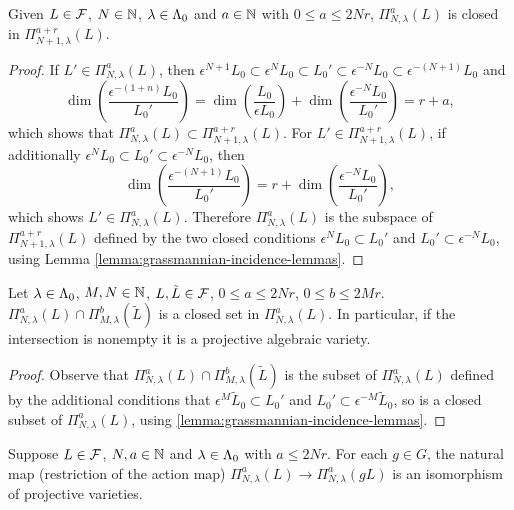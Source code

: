 \documentclass[a4paper, 11pt]{report}
\begin{document}
\begin{lemma}\label{lemma:nesting-subvarieties}
Given $L\in\mathcal{F}$, $N\in\mathbb{N}$, $\lambda\in\Lambda_0{}$ and $a\in\mathbb{N}$ with $0\le a\le 2Nr$, $\Pi_{N,\lambda}^a(L)$ is closed in $\Pi_{N+1,\lambda}^{a+r}(L)$.
\end{lemma}

\begin{proof}
If $L'\in\Pi_{N,\lambda}^{a}(L)$, then $\epsilon^{N+1}L_0\subset \epsilon^N L_0\subset L_0'\subset\epsilon^{-N}L_0\subset\epsilon^{-(N+1)}L_0$ and
\begin{equation*}
\dim\left(\frac{\epsilon^{-(1+n)}L_0}{L_0'}\right) = \dim\left(\frac{L_0}{\epsilon L_0}\right) + \dim\left(\frac{\epsilon^{-N}L_0}{L_0'}\right) = r+a,
\end{equation*}
which shows that $\Pi_{N,\lambda}^a(L)\subset \Pi_{N+1,\lambda}^{a+r}(L)$. For $L'\in\Pi_{N+1,\lambda}^{a+r}(L)$, if additionally $\epsilon^N L_0\subset L_0'\subset\epsilon^{-N}L_0$, then
\begin{equation*}
\dim\left(\frac{\epsilon^{-(N+1)}L_0}{L_0'}\right) = r + \dim\left(\frac{\epsilon^{-N}L_0}{L_0'}\right),
\end{equation*}
which shows $L'\in\Pi_{N,\lambda}^a(L)$. Therefore $\Pi_{N,\lambda}^a(L)$ is the subspace of $\Pi_{N+1,\lambda}^{a+r}(L)$ defined by the  two closed conditions $\epsilon^N L_0\subset L_0'$ and $L_0'\subset\epsilon^{-N}L_0$, using Lemma \ref{lemma:grassmannian-incidence-lemmas}.
\end{proof}

\begin{lemma}
Let $\lambda\in\Lambda_0{}$, $M,N\in\mathbb{N}$, $L,\tilde{L}\in\mathcal{F}$, $0\le a\le 2Nr$, $0\le b\le 2Mr$. $\Pi_{N,\lambda}^a(L)\cap \Pi_{M,\lambda}^b(\tilde{L})$ is a closed set in $\Pi_{N,\lambda}^a(L)$. In particular, if the intersection is nonempty it is a projective algebraic variety.
\end{lemma}

\begin{proof}
Observe that $\Pi_{N,\lambda}^a(L)\cap\Pi_{M,\lambda}^b(\tilde{L})$ is the subset of $\Pi_{N,\lambda}^a(L)$ defined by the additional conditions that $\epsilon^M \tilde{L}_0\subset L_0'$ and $L_0'\subset\epsilon^{-M}\tilde{L}_0$, so is a closed subset of $\Pi_{N,\lambda}^a(L)$, using \ref{lemma:grassmannian-incidence-lemmas}.
\end{proof}

\begin{lemma}
Suppose $L\in\mathcal{F}$, $N,a \in\mathbb{N}$ and $\lambda\in\Lambda_0{}$ with $a\le 2Nr$. For each $g\in G$, the natural map (restriction of the action map) $\Pi_{N,\lambda}^a(L)\to \Pi_{N,\lambda}^a(gL)$ is an isomorphism of projective varieties.
\end{lemma}
\end{document}
